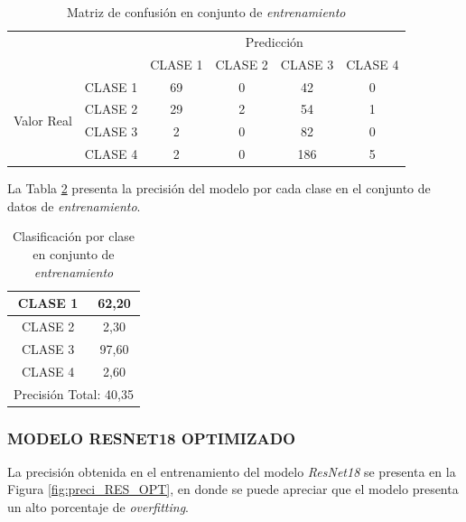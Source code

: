 \begin{table}[htbp]
	\centering
	\resizebox{11cm}{!} {
		\begin{tabular}{|c|l|c|c|c|c|}
			\hline
			\multicolumn{2}{|c|}{\multirow{2}[4]{*}{}} & \multicolumn{4}{c|}{Predicción} \bigstrut\\
			\cline{3-6}    \multicolumn{2}{|c|}{} & CLASE 1 & CLASE 2 & CLASE 3 & CLASE 4 \bigstrut\\
			\hline
			\multirow{4}[8]{*}{\begin{sideways}Valor Real\end{sideways}} & CLASE 1 & 69     & 0     & 42    & 0 \bigstrut\\
			\cline{2-6}          & CLASE 2 & 29     & 2     & 54    & 1 \bigstrut\\
			\cline{2-6}          & CLASE 3 & 2     & 0     & 82    & 0 \bigstrut\\
			\cline{2-6}          & CLASE 4 & 2     & 0     & 186    & 5 \bigstrut\\
			\hline
		\end{tabular}
	}
	\caption{Matriz de confusión en conjunto de \textit{entrenamiento}}
	\label{tab:MC_VGG11_OPT_2}%
\end{table}%

\newpage
La Tabla \ref{tab:VGG11optclases_2} presenta la precisión del modelo por cada clase en el conjunto de datos de \textit{entrenamiento}.

\begin{table}[htbp]
	\centering
	\begin{tabular}{|c|c|}
		\hline
		CLASE 1 & 62,20 \bigstrut\\
		\hline
		CLASE 2 & 2,30 \bigstrut\\
		\hline
		CLASE 3 & 97,60 \bigstrut\\
		\hline
		CLASE 4 & 2,60 \bigstrut\\
		\hline
		\multicolumn{2}{|c|}{Precisión Total: 40,35} \bigstrut\\
		\hline
	\end{tabular}%
	\caption{Clasificación por clase en conjunto de \textit{entrenamiento}}
	\label{tab:VGG11optclases_2}%
\end{table}%

\subsubsection{\MakeUppercase{Modelo ResNet18 Optimizado}}

La precisión obtenida en el entrenamiento del modelo \textit{ResNet18} se presenta en la Figura \ref{fig:preci_RES_OPT}, en donde se puede apreciar que el modelo presenta un alto porcentaje de \textit{overfitting}.

